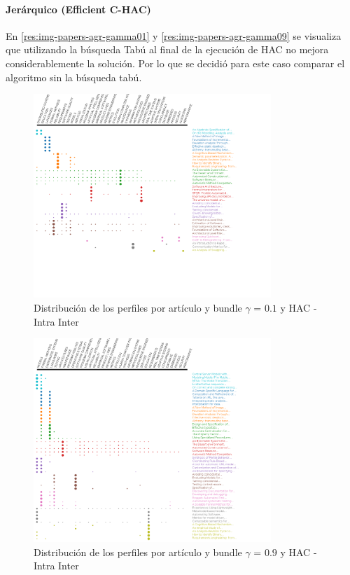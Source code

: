 \paragraph{Jerárquico (Efficient C-HAC)}
En \ref{res:img-papers-agr-gamma01} y \ref{res:img-papers-agr-gamma09} se visualiza que utilizando la búsqueda Tabú al final de la ejecución de HAC no mejora considerablemente la solución. Por lo que se decidió para este caso comparar el algoritmo sin la búsqueda tabú.
\begin{figure}[H]
  \centering
    \includegraphics[width=0.8\textwidth]{resultados/papers/HAC/INTRA_INTER/gamma-01.png}
  \caption{Distribución de los perfiles por artículo y bundle $\gamma$ = $0.1$ y HAC - Intra Inter}
  \label{res:img-papers-gamma01-hac-intra-inter}
\end{figure}

\begin{figure}[H]
  \centering
    \includegraphics[width=0.8\textwidth]{resultados/papers/HAC/INTRA_INTER/gamma-09.png}
  \caption{Distribución de los perfiles por artículo y bundle $\gamma$ = $0.9$ y HAC - Intra Inter}
  \label{res:img-papers-gamma09-hac-intra-inter}
\end{figure}


